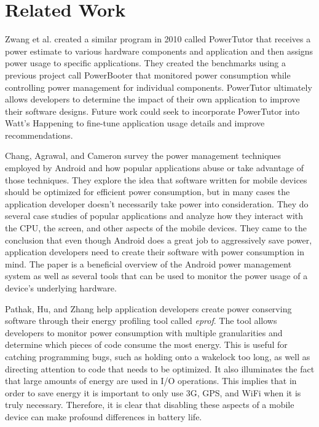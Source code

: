 \section*{Related Work}
\label{sec:related}
Zwang et al.\cite{Zhang:2010:AOP:1878961.1878982} created a similar program in 2010 called PowerTutor that receives a power estimate to various hardware components and application and then assigns power usage to specific applications.  
They created the benchmarks using a previous project call PowerBooter that monitored power consumption while controlling power management for individual components.  
PowerTutor ultimately allows developers to determine the impact of their own application to improve their software designs.  
Future work could seek to incorporate PowerTutor into Watt's Happening to fine-tune application usage details and improve recommendations.

Chang, Agrawal, and Cameron survey the power management techniques employed by Android and how popular applications abuse or take advantage of those techniques\cite{energy-aware}. 
They explore the idea that software written for mobile devices should be optimized for efficient power consumption, but in many cases the application developer doesn't necessarily take power into consideration. 
They do several case studies of popular applications and analyze how they interact with the CPU, the screen, and other aspects of the mobile devices. 
They came to the conclusion that even though Android does a great job to aggressively save power, application developers need to create their software with power consumption in mind. 
The paper is a beneficial overview of the Android power management system as well as several tools that can be used to monitor the power usage of a device's underlying hardware. 

Pathak, Hu, and Zhang help application developers create power conserving software through their energy profiling tool called \emph{eprof}\cite{Pathak:2012:ESI:2168836.2168841}. 
The tool allows developers to monitor power consumption with multiple granularities and determine which pieces of code consume the most energy. 
This is useful for catching programming bugs, such as holding onto a wakelock too long, as well as directing attention to code that needs to be optimized. 
It also illuminates the fact that large amounts of energy are used in I/O operations. 
This implies that in order to save energy it is important to only use 3G, GPS, and WiFi when it is truly necessary. 
Therefore, it is clear that disabling these aspects of a mobile device can make profound differences in battery life.

